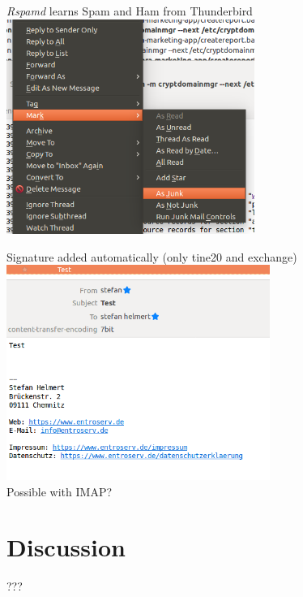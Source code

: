 \documentclass{beamer}
\begin{document}
\begin{frame}[fragile]{\insertsection}{\insertsubsection}
	\emph{Rspamd} learns Spam and Ham from Thunderbird
	\includegraphics[height=7cm]{TBlearn.png}\\
\end{frame}	

\begin{frame}[fragile]{\insertsection}{\insertsubsection}
	Signature added automatically (only tine20 and exchange)
	\includegraphics[height=7cm]{signature.png}\\
	Possible with IMAP?
\end{frame}

\section{Discussion}
\begin{frame}[fragile]{\insertsection}{\insertsubsection} %
  \Huge{???}	
\end{frame}	
\end{document}
